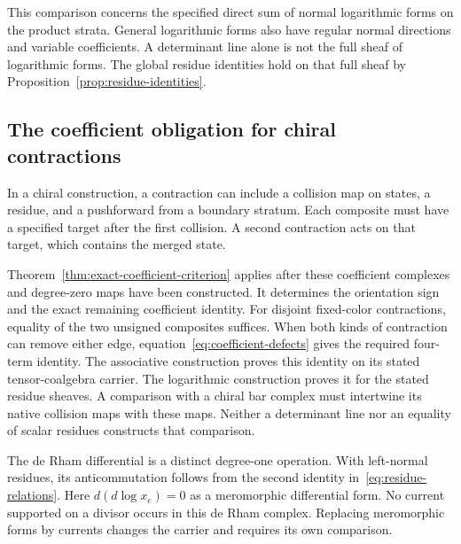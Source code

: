 This comparison concerns the specified direct sum of normal logarithmic forms on the product strata.
General logarithmic forms also have regular normal directions and variable coefficients.
A determinant line alone is not the full sheaf of logarithmic forms.
The global residue identities hold on that full sheaf by Proposition~\ref{prop:residue-identities}.

\subsection{The coefficient obligation for chiral contractions}
\label{subsec:chiral-coefficient-obligation}

In a chiral construction, a contraction can include a collision map on states,
a residue, and a pushforward from a boundary stratum.
Each composite must have a specified target after the first collision.
A second contraction acts on that target, which contains the merged state.

Theorem~\ref{thm:exact-coefficient-criterion} applies after these coefficient complexes and degree-zero maps have been constructed.
It determines the orientation sign and the exact remaining coefficient identity.
For disjoint fixed-color contractions, equality of the two unsigned composites suffices.
When both kinds of contraction can remove either edge, equation~\eqref{eq:coefficient-defects} gives the required four-term identity.
The associative construction proves this identity on its stated tensor-coalgebra carrier.
The logarithmic construction proves it for the stated residue sheaves.
A comparison with a chiral bar complex must intertwine its native collision maps with these maps.
Neither a determinant line nor an equality of scalar residues constructs that comparison.

The de Rham differential is a distinct degree-one operation.
With left-normal residues, its anticommutation follows from the second identity in~\eqref{eq:residue-relations}.
Here $d(d\log x_e)=0$ as a meromorphic differential form.
No current supported on a divisor occurs in this de Rham complex.
Replacing meromorphic forms by currents changes the carrier and requires its own comparison.
